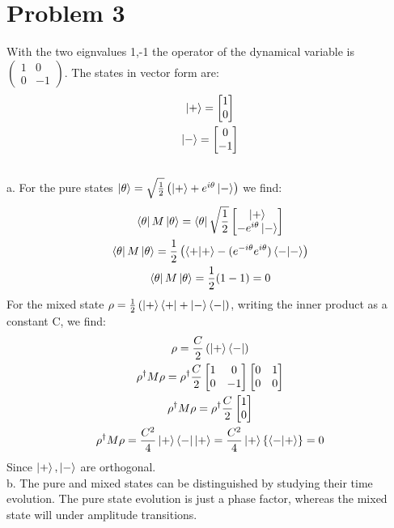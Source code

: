 \documentclass[a4paper,12pt]{article}
\numberwithin{equation}{section}
\begin{document}
\section{Problem 3}
With the two eignvalues 1,-1 the operator of the dynamical variable is $\left(\begin{smallmatrix}1&0\\0&-1\end{smallmatrix}\right)$.
The states in vector form are:
\begin{gather}
 \ket{+}=\begin{bmatrix}1\\0 \end{bmatrix}\\
 \ket{-}=\begin{bmatrix}0\\-1 \end{bmatrix}
\end{gather}
\\
a. For the pure states $\ket{\theta}=\sqrt{\frac{1}{2}}\left(\ket{+}+e^{i\theta}\ket{-}  \right)$ we find:
\begin{gather}
 \bra{\theta}M\ket{\theta}=\bra{\theta}\sqrt{\frac{1}{2}}\begin{bmatrix}\ket{+}\\-e^{i\theta}\ket{-} \end{bmatrix}\\
 \bra{\theta}M\ket{\theta}=\frac{1}{2}\left(\braket{+|+}-(e^{-i\theta}e^{i\theta})\braket{-|-}\right)\\
 \bra{\theta}M\ket{\theta}=\frac{1}{2}(1-1)=0
\end{gather}
For the mixed state $\rho=\frac{1}{2}\left(\ket{+}\braket{+|+|-}\bra{-}  \right)$, writing the inner product as a constant C, we find:
\begin{gather}
 \rho=\frac{C}{2}\left(\ket{+}\bra{-} \right)\\
 \rho^\dagger M \rho=\rho^\dagger \frac{C}{2} \begin{bmatrix}1&0\\0&-1\end{bmatrix} \begin{bmatrix}0&1\\0&0\end{bmatrix}\\
 \rho^\dagger M \rho=\rho^\dagger \frac{C}{2} \begin{bmatrix}1\\0\end{bmatrix}\\
 \rho^\dagger M \rho=\frac{C^2}{4}\ket{+}\bra{-}\ket{+}=\frac{C^2}{4}\ket{+}\left\{ \braket{-|+} \right\}=0
\end{gather}
Since $\ket{+},\ket{-}$ are orthogonal.\\
b. The pure and mixed states can be distinguished by studying their time evolution. 
The pure state evolution is just a phase factor, whereas the mixed state will under amplitude transitions.
\end{document}
